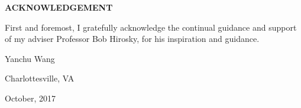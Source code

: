 \begin{center}
\textbf{\huge ACKNOWLEDGEMENT}
\end{center}
\vspace{0.5cm}

First and foremost, I gratefully acknowledge the continual guidance and support of my adviser Professor Bob Hirosky, for his inspiration and guidance. 

\vspace{0.5cm}
\begin{flushleft}
Yanchu Wang

Charlottesville, VA

October, 2017
\end{flushleft}
